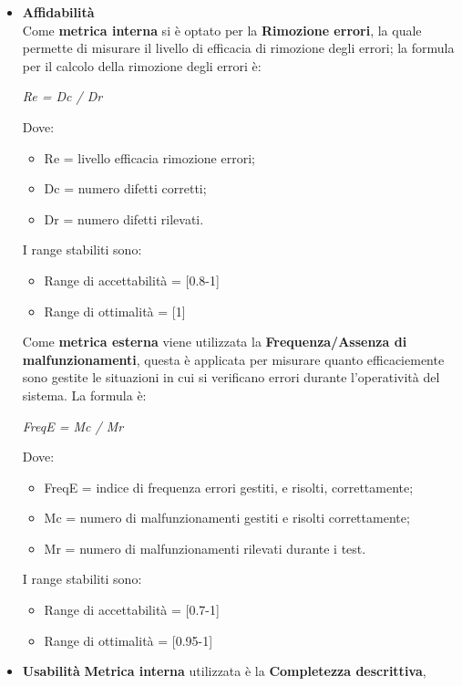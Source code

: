 \begin{itemize}
\begin{itemize}
      \end{itemize}
      \item \textbf{Affidabilità}\\
      Come \textbf{metrica interna} si è optato per la \textbf{Rimozione errori},
      la quale permette di misurare il livello di efficacia di rimozione degli errori;
      la formula per il calcolo della rimozione degli errori è:
      \begin{center}
        \emph{Re = Dc / Dr}
      \end{center}
      Dove:
      \begin{itemize}
        \item Re = livello efficacia rimozione errori;
        \item Dc = numero difetti corretti;
        \item Dr = numero difetti rilevati.
      \end{itemize}
      I range stabiliti sono:
      \begin{itemize}
        \item Range di accettabilità = [0.8-1]
        \item Range di ottimalità = [1]
      \end{itemize}
      Come \textbf{metrica esterna} viene utilizzata la \textbf{Frequenza/Assenza di malfunzionamenti},
      questa è applicata per misurare quanto efficaciemente sono gestite le situazioni in cui si verificano errori durante l'operatività del sistema.
      La formula è:
      \begin{center}
        \emph{FreqE = Mc / Mr}
      \end{center}
      Dove:
      \begin{itemize}
        \item FreqE = indice di frequenza errori gestiti, e risolti, correttamente;
        \item Mc = numero di malfunzionamenti gestiti e risolti correttamente;
        \item Mr = numero di malfunzionamenti rilevati durante i test.
      \end{itemize}
      I range stabiliti sono:
      \begin{itemize}
        \item Range di accettabilità = [0.7-1]
        \item Range di ottimalità = [0.95-1]
      \end{itemize}
      \item \textbf{Usabilità}
      \textbf{Metrica interna} utilizzata è la \textbf{Completezza descrittiva},

\end{itemize}
